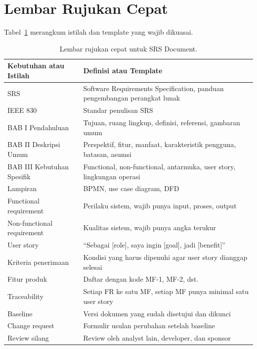 \documentclass[11pt,a4paper]{article}
\begin{document}
\section{Lembar Rujukan Cepat}

Tabel~\ref{tab:cheat} merangkum istilah dan template yang wajib dikuasai.

\begin{table}[H]
	\centering
	\caption{Lembar rujukan cepat untuk SRS Document.}
	\label{tab:cheat}
	\footnotesize
	\begin{tabularx}{\textwidth}{l X}
		\toprule
		Kebutuhan atau Istilah     & Definisi atau Template                                                    \\
		\midrule
		SRS                        & Software Requirements Specification, panduan pengembangan perangkat lunak \\
		IEEE 830                   & Standar penulisan SRS                                                     \\
		BAB I Pendahuluan          & Tujuan, ruang lingkup, definisi, referensi, gambaran umum                 \\
		BAB II Deskripsi Umum      & Perspektif, fitur, manfaat, karakteristik pengguna, batasan, asumsi       \\
		BAB III Kebutuhan Spesifik & Functional, non-functional, antarmuka, user story, lingkungan operasi     \\
		Lampiran                   & BPMN, use case diagram, DFD                                               \\
		Functional requirement     & Perilaku sistem, wajib punya input, proses, output                        \\
		Non-functional requirement & Kualitas sistem, wajib punya angka terukur                                \\
		User story                 & ``Sebagai [role], saya ingin [goal], jadi [benefit]''                     \\
		Kriteria penerimaan        & Kondisi yang harus dipenuhi agar user story dianggap selesai              \\
		Fitur produk               & Daftar dengan kode MF-1, MF-2, dst.                                       \\
		Traceability               & Setiap FR ke satu MF, setiap MF punya minimal satu user story             \\
		Baseline                   & Versi dokumen yang sudah disetujui dan dikunci                            \\
		Change request             & Formulir usulan perubahan setelah baseline                                \\
		Review silang              & Review oleh analyst lain, developer, dan sponsor                          \\
		\bottomrule
	\end{tabularx}
\end{table}
\end{document}
